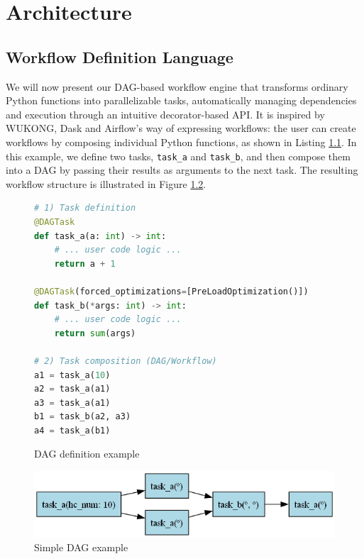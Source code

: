 \chapter{Architecture}
\chaptoc
\label{chap:arch}
\bigskip

\section{Workflow Definition Language}
\label{ss:workflow_definition_language}

We will now present our DAG-based workflow engine that transforms ordinary Python functions into parallelizable tasks, automatically managing dependencies and execution through an intuitive decorator-based API. It is inspired by WUKONG, Dask and Airflow's way of expressing workflows: the user can create workflows by composing individual Python functions, as shown in Listing \ref{lst:dag_lang_example}. In this example, we define two tasks, \texttt{task\_a} and \texttt{task\_b}, and then compose them into a DAG by passing their results as arguments to the next task. The resulting workflow structure is illustrated in Figure \ref{fig:dag_lang_example}.

\begin{figure}[h]
\centering
\begin{lstlisting}[language=Python, basicstyle=\ttfamily\footnotesize, columns=fullflexible, breaklines=true]
# 1) Task definition
@DAGTask
def task_a(a: int) -> int:
    # ... user code logic ...
    return a + 1

@DAGTask(forced_optimizations=[PreLoadOptimization()])
def task_b(*args: int) -> int:
    # ... user code logic ...
    return sum(args)

# 2) Task composition (DAG/Workflow)
a1 = task_a(10)
a2 = task_a(a1)
a3 = task_a(a1)
b1 = task_b(a2, a3)
a4 = task_a(b1)
\end{lstlisting}
\caption{DAG definition example}
\label{lst:dag_lang_example}
\end{figure}

\begin{figure}[h]
    \centering
    \includegraphics[width=\columnwidth]{Images/mine/dag_lang_example.png}
    \caption{Simple DAG example}
    \label{fig:dag_lang_example}
\end{figure}


